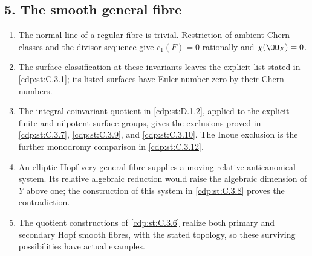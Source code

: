 \subsection*{5. The smooth general fibre}
\RungOne
\begin{enumerate}[label=\arabic*.,leftmargin=*]
\item The normal line of a regular fibre is trivial.
Restriction of ambient Chern classes and the divisor sequence give
$c_1(F)=0$ rationally and $\chi(\OO_F)=0$.
\item The surface classification at these invariants leaves the
explicit list stated in \ref{cdp:st:C.3.1}; its listed surfaces
have Euler number zero by their Chern numbers.
\item The integral coinvariant quotient in
\ref{cdp:st:D.1.2}, applied to the explicit finite and nilpotent
surface groups, gives the exclusions proved in
\ref{cdp:st:C.3.7}, \ref{cdp:st:C.3.9}, and
\ref{cdp:st:C.3.10}.  The Inoue exclusion is the further
monodromy comparison in \ref{cdp:st:C.3.12}.
\item An elliptic Hopf very general fibre supplies a moving
relative anticanonical system.  Its relative algebraic reduction
would raise the algebraic dimension of $Y$ above one; the
construction of this system in \ref{cdp:st:C.3.8} proves the
contradiction.
\item The quotient constructions of \ref{cdp:st:C.3.6} realize
both primary and secondary Hopf smooth fibres, with the stated
topology, so these surviving possibilities have actual examples.
\end{enumerate}

